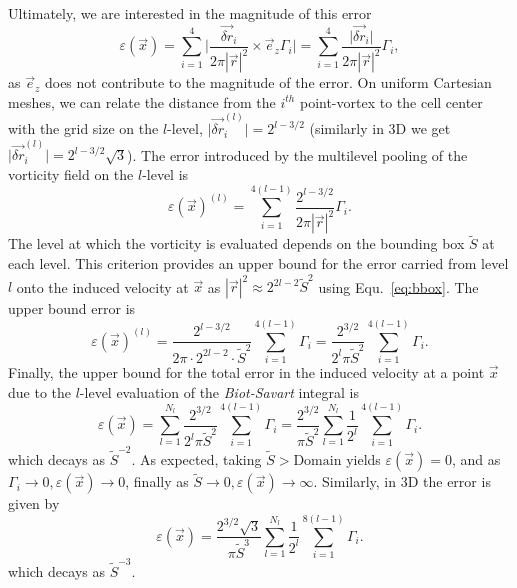 \documentclass{article}
\begin{document}
Ultimately, we are interested in the magnitude of this error
\begin{equation}
    \varepsilon(\vec{x}) = \sum_{i=1}^{4}\vert\frac{\vec{\delta r}_i}{2\pi|\vec{r}|^2}\times\vec{e}_z\Gamma_i\vert = 
    \sum_{i=1}^{4}\frac{\vert\vec{\delta r}_i\vert}{2\pi|\vec{r}|^2}\Gamma_i,
\end{equation}
as $\vec{e}_z$ does not contribute to the magnitude of the error. On uniform Cartesian meshes, we can relate the distance from the $i^{th}$ point-vortex to the cell center with the grid size on the $l$-level, $\vert\vec{\delta r}_i^{(l)}\vert=2^{l-3/2}$ (similarly in 3D we get $\vert\vec{\delta r}_i^{(l)}\vert=2^{l-3/2}\sqrt{3}$). The error introduced by the multilevel pooling of the vorticity field on the $l$-level is
\begin{equation}
    \varepsilon(\vec{x})^{(l)} = \sum_{i=1}^{4(l-1)}\frac{2^{l-3/2}}{2\pi|\vec{r}|^2}\Gamma_i.
\end{equation}
The level at which the vorticity is evaluated depends on the bounding box $\tilde{S}$ at each level. This criterion provides an upper bound for the error carried from level $l$ onto the induced velocity at $\vec x$ as $|\vec{r}|^2 \approx 2^{2l-2}\tilde{S}^2$ using Equ.~\ref{eq:bbox}. The upper bound error is
\begin{equation}
    \varepsilon(\vec{x})^{(l)} = \frac{2^{l-3/2}}{2\pi\cdot2^{2l-2}\cdot\tilde{S}^2}\sum_{i=1}^{4(l-1)}\Gamma_i = \frac{2^{3/2}}{2^{l}\pi\tilde{S}^2}\sum_{i=1}^{4(l-1)}\Gamma_i.
\end{equation}
Finally, the upper bound for the total error in the induced velocity at a point $\vec x$ due to the $l$-level evaluation of the \emph{Biot-Savart} integral is
\begin{equation}
    \varepsilon(\vec{x}) = \sum_{l=1}^{N_l}\frac{2^{3/2}}{2^{l}\pi\tilde{S}^2}\sum_{i=1}^{4(l-1)}\Gamma_i = \frac{2^{3/2}}{\pi\tilde{S}^2}\sum_{l=1}^{N_l}\frac{1}{2^l}\sum_{i=1}^{4(l-1)}\Gamma_i.
\end{equation}
which decays as $\tilde{S}^{-2}$. As expected, taking $\tilde{S}>\text{Domain}$ yields $\varepsilon(\vec{x}) = 0$, and as $\Gamma_i \to 0, \varepsilon(\vec{x})\to 0$, finally as $\tilde{S}\to0, \varepsilon(\vec{x}) \to \infty$. Similarly, in 3D the error is given by
\begin{equation}
    \varepsilon(\vec{x}) = \frac{2^{3/2}\sqrt{3}}{\pi\tilde{S}^3}\sum_{l=1}^{N_l}\frac{1}{2^{l}}\sum_{i=1}^{8(l-1)}\Gamma_i.
\end{equation}
which decays as $\tilde{S}^{-3}$. 
\end{document}
